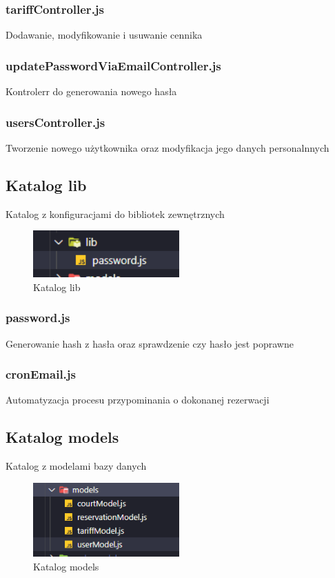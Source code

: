 \documentclass[titlepage]{article}
\begin{document}
\subsubsection{tariffController.js}
Dodawanie, modyfikowanie i usuwanie cennika

\subsubsection{updatePasswordViaEmailController.js}
Kontrolerr do generowania nowego hasła

\subsubsection{usersController.js}
Tworzenie nowego użytkownika oraz modyfikacja jego danych personalnnych

\newpage
\subsection{Katalog lib}
Katalog z konfiguracjami do bibliotek zewnętrznych

\begin{figure}[h]
\centering
\includegraphics[width=0.5\textwidth]{lib.png}
\caption{Katalog lib}
\label{fig:obrazek lib}
\end{figure}

\subsubsection{password.js}
Generowanie hash z hasła oraz sprawdzenie czy hasło jest poprawne 

\subsubsection{cronEmail.js}
Automatyzacja procesu przypominania o dokonanej rezerwacji


\subsection{Katalog models}
Katalog z modelami bazy danych

\begin{figure}[h]
\centering
\includegraphics[width=0.5\textwidth]{models.png}
\caption{Katalog models}
\label{fig:obrazek models}
\end{figure}
\end{document}

